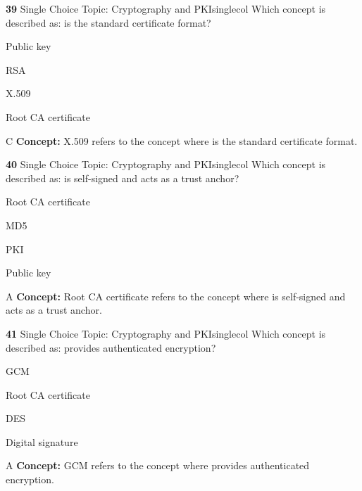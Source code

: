 \documentclass[10pt,a4paper]{article}
\begin{document}
\begin{qcard}{\color{white}\textbf{39} \hfill \small Single Choice \textbar{} Topic: Cryptography and PKI}{singlecol}
Which concept is described as: is the standard certificate format?

\begin{qoptions}
\item Public key
\item RSA
\item X.509
\item Root CA certificate
\end{qoptions}
\begin{explainbox}{C}
\textbf{Concept:} X.509 refers to the concept where is the standard certificate format.
\end{explainbox}
\end{qcard}

\begin{qcard}{\color{white}\textbf{40} \hfill \small Single Choice \textbar{} Topic: Cryptography and PKI}{singlecol}
Which concept is described as: is self-signed and acts as a trust anchor?

\begin{qoptions}
\item Root CA certificate
\item MD5
\item PKI
\item Public key
\end{qoptions}
\begin{explainbox}{A}
\textbf{Concept:} Root CA certificate refers to the concept where is self-signed and acts as a trust anchor.
\end{explainbox}
\end{qcard}

\begin{qcard}{\color{white}\textbf{41} \hfill \small Single Choice \textbar{} Topic: Cryptography and PKI}{singlecol}
Which concept is described as: provides authenticated encryption?

\begin{qoptions}
\item GCM
\item Root CA certificate
\item DES
\item Digital signature
\end{qoptions}
\begin{explainbox}{A}
\textbf{Concept:} GCM refers to the concept where provides authenticated encryption.
\end{explainbox}
\end{qcard}
\end{document}
